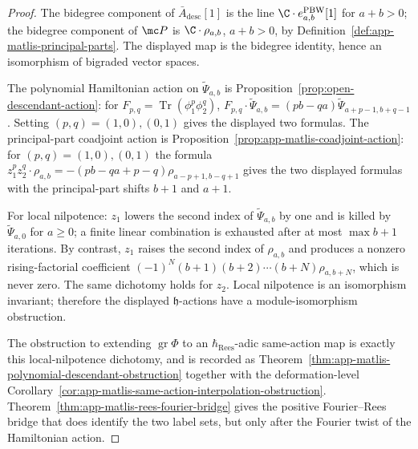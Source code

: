 \begin{proof}
  The bidegree component of \(\bar A_{\mathrm{desc}}[1]\) is the line
  \(\C\cdot e^{\mathrm{PBW}}_{a,b}[1]\) for \(a+b>0\); the bidegree
  component of \(\mc P\) is \(\C\cdot\rho_{a,b}\), \(a+b>0\), by
  Definition~\ref{def:app-matlis-principal-parts}.  The displayed map
  is the bidegree identity, hence an isomorphism of bigraded vector
  spaces.

  The polynomial Hamiltonian action on \(\widetilde\Psi_{a,b}\) is
  Proposition~\ref{prop:open-descendant-action}: for
  \(F_{p,q}=\operatorname{Tr}(\phi_1^p\phi_2^q)\),
  \(F_{p,q}\cdot\widetilde\Psi_{a,b}=(pb-qa)\widetilde\Psi_{a+p-1,b+q-1}\).
  Setting \((p,q)=(1,0),(0,1)\) gives the displayed two formulas.  The
  principal-part coadjoint action is
  Proposition~\ref{prop:app-matlis-coadjoint-action}: for
  \((p,q)=(1,0),(0,1)\) the formula
  \(z_1^pz_2^q\cdot\rho_{a,b}=-(pb-qa+p-q)\rho_{a-p+1,b-q+1}\) gives the
  two displayed formulas with the principal-part shifts
  \(b+1\) and \(a+1\).

  For local nilpotence: \(z_1\) lowers the second index of
  \(\widetilde\Psi_{a,b}\) by one and is killed by \(\widetilde\Psi_{a,0}\)
  for \(a\geq0\); a finite linear combination is exhausted after at most
  \(\max b+1\) iterations.  By contrast, \(z_1\) raises the second index
  of \(\rho_{a,b}\) and produces a nonzero rising-factorial coefficient
  \((-1)^N(b+1)(b+2)\cdots(b+N)\rho_{a,b+N}\), which is never zero.  The
  same dichotomy holds for \(z_2\).  Local nilpotence is an isomorphism
  invariant; therefore the displayed \(\mathfrak h\)-actions have a
  module-isomorphism obstruction.

  The obstruction to extending \(\operatorname{gr}\Phi\) to an
  \(\hbar_{\mathrm{Rees}}\)-adic same-action map is exactly this local-nilpotence
  dichotomy, and is recorded as
  Theorem~\ref{thm:app-matlis-polynomial-descendant-obstruction} together
  with the deformation-level
  Corollary~\ref{cor:app-matlis-same-action-interpolation-obstruction}.
  Theorem~\ref{thm:app-matlis-rees-fourier-bridge} gives the
  positive Fourier--Rees bridge that does identify the two label sets,
  but only after the Fourier twist of the Hamiltonian action.
\end{proof}

